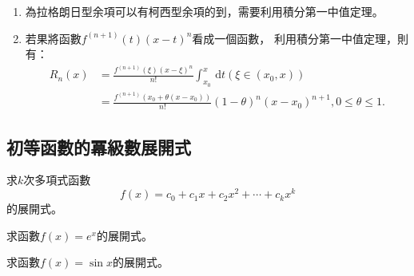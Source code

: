 \documentclass[a4paper,12pt]{article}
\theoremstyle{theorem}
\begin{document}
\begin{CJK*}{UTF8}{bsmi}
    \begin{remark}
        \begin{enumerate}[label={\rm(\arabic*)}]
            \item 為拉格朗日型余項可以有柯西型余項的到，需要利用積分第一中值定理。
            \item 若果將函數$\displaystyle f^{(n+1)}(t)(x - t)^n$看成一個函數，
                利用積分第一中值定理，則有：
                \begin{equation}
                    \begin{split}
                        R_n(x) & = \frac{f^{(n+1)}(\xi)(x - \xi)^n}{n!} 
                    \int_{x_0}^{x}\, \mathrm{d}t (\xi \in (x_0, x)) \\
                        & = \frac{f^{(n+1)}(x_0 + \theta(x - x_0))}{n!} 
                            (1 - \theta)^n(x - x_0)^{n+1}, 0 \le \theta \le 1.
                    \end{split}
                \end{equation}
        \end{enumerate}
    \end{remark}

    \subsection{初等函數的冪級數展開式}
    \begin{example}
        求$k$次多項式函數
        \[
            f(x) = c_0 + c_1 x + c_2 x^2 + \cdots + c_k x^k
        \]
        的展開式。
    \end{example}

    \begin{example}
        求函數$\displaystyle f(x) = e^x$的展開式。
    \end{example}

    \begin{example}
        求函數$\displaystyle f(x) = \sin x$的展開式。
    \end{example}


\end{CJK*}
\end{document}
